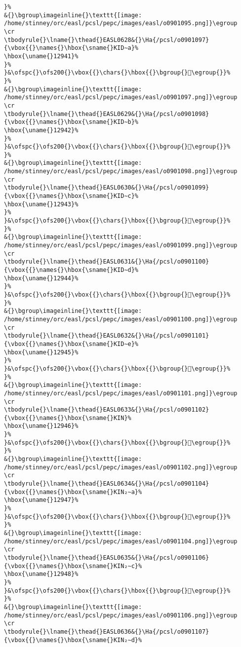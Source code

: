 \begin{verbatim}
}%
&{}\bgroup\imageinline{}\texttt{[image: /home/stinney/orc/easl/pcsl/pepc/images/easl/o0901095.png]}\egroup
\cr
\tbodyrule{}\lname{}\thead{}EASL0628&{}\Ha{/pcsl/o0901097}{\vbox{{}\names{}\hbox{\sname{}KID∼a}%
\hbox{\uname{}12941}%
}%
}&\ofspc{}\ofs200{}\vbox{{}\chars{}\hbox{{}\bgroup{}𒥁\egroup{}}%
}%
&{}\bgroup\imageinline{}\texttt{[image: /home/stinney/orc/easl/pcsl/pepc/images/easl/o0901097.png]}\egroup
\cr
\tbodyrule{}\lname{}\thead{}EASL0629&{}\Ha{/pcsl/o0901098}{\vbox{{}\names{}\hbox{\sname{}KID∼b}%
\hbox{\uname{}12942}%
}%
}&\ofspc{}\ofs200{}\vbox{{}\chars{}\hbox{{}\bgroup{}𒥂\egroup{}}%
}%
&{}\bgroup\imageinline{}\texttt{[image: /home/stinney/orc/easl/pcsl/pepc/images/easl/o0901098.png]}\egroup
\cr
\tbodyrule{}\lname{}\thead{}EASL0630&{}\Ha{/pcsl/o0901099}{\vbox{{}\names{}\hbox{\sname{}KID∼c}%
\hbox{\uname{}12943}%
}%
}&\ofspc{}\ofs200{}\vbox{{}\chars{}\hbox{{}\bgroup{}𒥃\egroup{}}%
}%
&{}\bgroup\imageinline{}\texttt{[image: /home/stinney/orc/easl/pcsl/pepc/images/easl/o0901099.png]}\egroup
\cr
\tbodyrule{}\lname{}\thead{}EASL0631&{}\Ha{/pcsl/o0901100}{\vbox{{}\names{}\hbox{\sname{}KID∼d}%
\hbox{\uname{}12944}%
}%
}&\ofspc{}\ofs200{}\vbox{{}\chars{}\hbox{{}\bgroup{}𒥄\egroup{}}%
}%
&{}\bgroup\imageinline{}\texttt{[image: /home/stinney/orc/easl/pcsl/pepc/images/easl/o0901100.png]}\egroup
\cr
\tbodyrule{}\lname{}\thead{}EASL0632&{}\Ha{/pcsl/o0901101}{\vbox{{}\names{}\hbox{\sname{}KID∼e}%
\hbox{\uname{}12945}%
}%
}&\ofspc{}\ofs200{}\vbox{{}\chars{}\hbox{{}\bgroup{}𒥅\egroup{}}%
}%
&{}\bgroup\imageinline{}\texttt{[image: /home/stinney/orc/easl/pcsl/pepc/images/easl/o0901101.png]}\egroup
\cr
\tbodyrule{}\lname{}\thead{}EASL0633&{}\Ha{/pcsl/o0901102}{\vbox{{}\names{}\hbox{\sname{}KIN}%
\hbox{\uname{}12946}%
}%
}&\ofspc{}\ofs200{}\vbox{{}\chars{}\hbox{{}\bgroup{}𒥆\egroup{}}%
}%
&{}\bgroup\imageinline{}\texttt{[image: /home/stinney/orc/easl/pcsl/pepc/images/easl/o0901102.png]}\egroup
\cr
\tbodyrule{}\lname{}\thead{}EASL0634&{}\Ha{/pcsl/o0901104}{\vbox{{}\names{}\hbox{\sname{}KIN₂∼a}%
\hbox{\uname{}12947}%
}%
}&\ofspc{}\ofs200{}\vbox{{}\chars{}\hbox{{}\bgroup{}𒥇\egroup{}}%
}%
&{}\bgroup\imageinline{}\texttt{[image: /home/stinney/orc/easl/pcsl/pepc/images/easl/o0901104.png]}\egroup
\cr
\tbodyrule{}\lname{}\thead{}EASL0635&{}\Ha{/pcsl/o0901106}{\vbox{{}\names{}\hbox{\sname{}KIN₂∼c}%
\hbox{\uname{}12948}%
}%
}&\ofspc{}\ofs200{}\vbox{{}\chars{}\hbox{{}\bgroup{}𒥈\egroup{}}%
}%
&{}\bgroup\imageinline{}\texttt{[image: /home/stinney/orc/easl/pcsl/pepc/images/easl/o0901106.png]}\egroup
\cr
\tbodyrule{}\lname{}\thead{}EASL0636&{}\Ha{/pcsl/o0901107}{\vbox{{}\names{}\hbox{\sname{}KIN₂∼d}%

\end{verbatim}

